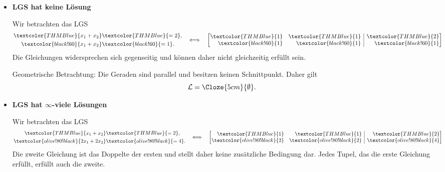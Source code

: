 \begin{itemize}[leftmargin=1.6em,itemsep=1.2em]
  \item
    \begin{minipage}[t]{\linewidth}
    \textbf{LGS hat keine Lösung}\par\smallskip
    \noindent
    \begin{minipage}[c]{0.64\linewidth}
      Wir betrachten das LGS
      \[
        \begin{aligned}
          \textcolor{THMBlue}{x_1+x_2}&\textcolor{THMBlue}{=2},\\
          \textcolor{black!60}{x_1+x_2}&\textcolor{black!60}{=1}.
        \end{aligned}
        \quad\Longleftrightarrow\quad
        \left[
          \begin{array}{@{}rr|r@{}}
            \textcolor{THMBlue}{1}&\textcolor{THMBlue}{1}&\textcolor{THMBlue}{2}\\
            \textcolor{black!60}{1}&\textcolor{black!60}{1}&\textcolor{black!60}{1}
          \end{array}
        \right]
      \]
      Die Gleichungen widersprechen sich gegenseitig und können daher
      nicht gleichzeitig erfüllt sein.

      \smallskip
      Geometrische Betrachtung: Die Geraden sind parallel und besitzen
      keinen Schnittpunkt. Daher gilt
      \[
        \mathcal{L}=\Cloze{5cm}{\emptyset}.
      \]
    \end{minipage}\hfill
    \begin{minipage}[c]{0.32\linewidth}
      \centering
    \end{minipage}
    \end{minipage}

  \item
    \begin{minipage}[t]{\linewidth}
    \textbf{LGS hat $\infty$-viele Lösungen}\par\smallskip
    \noindent
    \begin{minipage}[c]{0.64\linewidth}
      Wir betrachten das LGS
      \[
        \begin{aligned}
          \textcolor{THMBlue}{x_1+x_2}&\textcolor{THMBlue}{=2},\\
          \textcolor{olive!80!black}{2x_1+2x_2}&\textcolor{olive!80!black}{=4}.
        \end{aligned}
        \quad\Longleftrightarrow\quad
        \left[
          \begin{array}{@{}rr|r@{}}
            \textcolor{THMBlue}{1}&\textcolor{THMBlue}{1}&\textcolor{THMBlue}{2}\\
            \textcolor{olive!80!black}{2}&\textcolor{olive!80!black}{2}&\textcolor{olive!80!black}{4}
          \end{array}
        \right]
      \]
      Die zweite Gleichung ist das Doppelte der ersten und stellt daher
      keine zusätzliche Bedingung dar. Jedes Tupel,
      das die erste Gleichung erfüllt, erfüllt auch die zweite.


\end{minipage}
\end{minipage}
\end{itemize}
